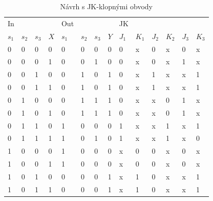 \begin{table}[h]
  \centering
  \caption{Návrh s JK-klopnými obvody}
    \begin{tabular}{llll|llll|llllll}
    In    &       &       &       & Out   &       &       &       & JK    &       &       &       &       &  \\
    $s_1$    & $s_2$    & $s_3$    & $X$     & $s_1$    & $s_2$    & $s_3$    & $Y$    & $J_1$    & $K_1$    & $J_2$    & $K_2$    & $J_3$    & $K_3$ \\
    \hline
    0     & 0     & 0     & 0     & 0     & 0     & 0     & 0     & 0     & x     & 0     & x     & 0     & x \\
    0     & 0     & 0     & 1     & 0     & 0     & 1     & 0     & 0     & x     & 0     & x     & 1     & x \\
    0     & 0     & 1     & 0     & 0     & 1     & 0     & 1     & 0     & x     & 1     & x     & x     & 1 \\
    0     & 0     & 1     & 1     & 0     & 1     & 0     & 1     & 0     & x     & 1     & x     & x     & 1 \\
    0     & 1     & 0     & 0     & 0     & 1     & 1     & 1     & 0     & x     & x     & 0     & 1     & x \\
    0     & 1     & 0     & 1     & 0     & 1     & 1     & 1     & 0     & x     & x     & 0     & 1     & x \\
    0     & 1     & 1     & 0     & 1     & 0     & 0     & 0     & 1     & x     & x     & 1     & x     & 1 \\
    0     & 1     & 1     & 1     & 1     & 0     & 1     & 0     & 1     & x     & x     & 1     & x     & 0 \\
    1     & 0     & 0     & 0     & 1     & 0     & 0     & 0     & x     & 0     & 0     & x     & 0     & x \\
    1     & 0     & 0     & 1     & 1     & 0     & 0     & 0     & x     & 0     & 0     & x     & 0     & x \\
    1     & 0     & 1     & 0     & 0     & 0     & 0     & 1     & x     & 1     & 0     & x     & x     & 1 \\
    1     & 0     & 1     & 1     & 0     & 0     & 0     & 1     & x     & 1     & 0     & x     & x     & 1 \\
    \end{tabular}%
  \label{tab:addlabel}%
\end{table}%

